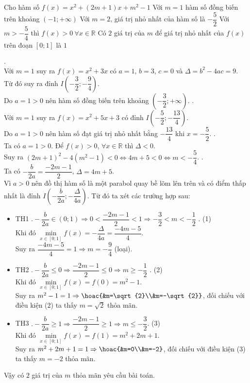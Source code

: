 \begin{ex}%
	Cho hàm số $ f(x)=x^2+(2m+1)x+m^2-1$ 
	\choiceTF
	{\True Với $m=1$ hàm số đồng biến trên khoảng $\left(-1;+\infty\right)$}
	{Với $m=2$, giá trị nhỏ nhất của hàm số là $-\dfrac{5}{2}$}
	{Với $m>-\dfrac{5}{4}$ thì $f(x)>0 \ \forall x \in \mathbb{R}$}
	{\True Có $2$ giá trị của $m$ để giá trị nhỏ nhất của $f(x)$ trên đoạn $[0;1]$ là $1$}
	\loigiai 
	{\begin{itemchoice}
			.\\
			Với $m=1$ suy ra $f(x)=x^2+3x$ có $a=1$, $b=3$, $c=0$ và $\Delta=b^2-4ac=9$.\\
			Từ đó suy ra đỉnh $I\left(-\dfrac{3}{2};-\dfrac{9}{4}\right)$.\\
			Do $a=1>0$ nên hàm số đồng biến trên khoảng $\left(-\dfrac{3}{2};+\infty\right)$. 
			.\\
			Với $m=1$ suy ra $f(x)=x^2+5x+3$ có đỉnh $I\left(-\dfrac{5}{2};-\dfrac{13}{4}\right)$.\\
			Do $a=1>0$ nên hàm số đạt giá trị nhỏ nhất bằng $-\dfrac{13}{4}$ khi $x=-\dfrac{5}{2}$. 
			.\\
			Ta có $a=1>0$. Để $f(x)>0$, $\forall x \in \mathbb{R}$ thì $\Delta<0$.\\
			Suy ra $\left(2m+1\right)^{2}-4\left(m^{2}-1\right)<0 \Leftrightarrow 4m+5<0 \Leftrightarrow m<-\dfrac{5}{4}$.
			.\\
			Ta có $-\dfrac{b}{2a}=\dfrac{-2m-1}{2}$, $\Delta=4m+5$.\\
			Vì $a>0$ nên đồ thị hàm số là một parabol quay bề lõm lên trên và có điểm thấp nhất là đỉnh $I\left(-\dfrac{b}{2a};-\dfrac{\Delta}{4a}\right)$. Từ đó ta xét các trường hợp sau:
		\begin{itemize}
			\item TH1 $.-\dfrac{b}{2a} \in (0;1) \Rightarrow 0<\dfrac{-2m-1}{2}<1 \Rightarrow -\dfrac{3}{2}<m<-\dfrac{1}{2}$ . \hfill (1)\\
			Khi đó $\min\limits_{x\in[0;1]} f(x)=-\dfrac{\Delta}{4a}=\dfrac{-4m-5}{4}$.\\
			Suy ra $\dfrac{-4m-5}{4}=1\Rightarrow m=-\dfrac{9}{4}$ (loại).
			\item TH2 $.-\dfrac{b}{2a} \le 0 \Rightarrow \dfrac{-2m-1}{2}\le 0 \Rightarrow m \ge -\dfrac{1}{2}$ . \hfill (2)\\
			Khi đó $\min\limits_{x\in[0;1]}f(x)=f(0)=m^{2}-1$.\\
			Suy ra $m^{2}-1=1\Rightarrow \hoac{&m=\sqrt{2}\\&m=-\sqrt{2}}$, đối chiếu với điều kiện (2) ta thấy $m=\sqrt{2}$ thỏa mãn.
			\item TH3 $.-\dfrac{b}{2a} \ge 1 \Rightarrow \dfrac{-2m-1}{2}\ge 1 \Rightarrow m \le -\dfrac{3}{2}$. \hfill (3)\\
			Khi đó $\min\limits_{x\in[0;1]} f(x)=f(1)=m^{2}+2m+1$.\\
			Suy ra $m^{2}+2m+1=1\Rightarrow \hoac{&m=0\\&m=-2}$, đối chiếu với điều kiện (3) ta thấy $m=-2$ thỏa mãn.
		\end{itemize}
	Vậy có $2$ giá trị của $m$ thỏa mãn yêu cầu bài toán.
		\end{itemchoice}
	}
\end{ex}

